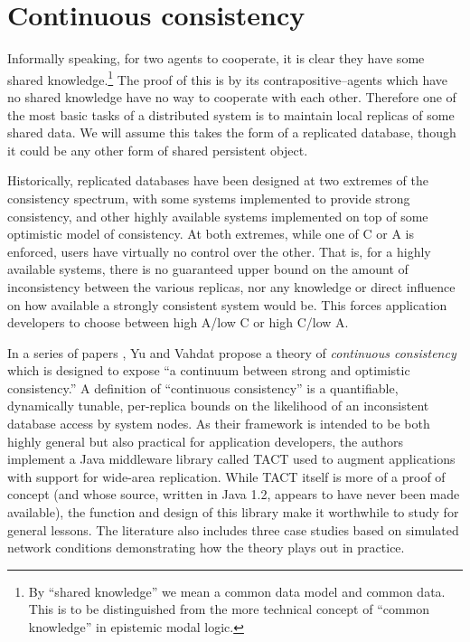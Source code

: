 \section{Continuous consistency}


Informally speaking, for two agents to cooperate, it is clear they have some shared knowledge.\footnote{By ``shared knowledge'' we mean a common data model and common data. This is to be distinguished from the more technical concept of ``common knowledge'' in epistemic modal logic.} The proof of this is by its contrapositive--agents which have no shared knowledge have no way to cooperate with each other. Therefore one of the most basic tasks of a distributed system is to maintain local replicas of some shared data. We will assume this takes the form of a replicated database, though it could be any other form of shared persistent object.

Historically, replicated databases have been designed at two extremes of the consistency spectrum, with some systems implemented to provide strong consistency, and other highly available systems implemented on top of some optimistic model of consistency. At both extremes, while one of C or A is enforced, users have virtually no control over the other. That is, for a highly available systems, there is no guaranteed upper bound on the amount of inconsistency between the various replicas, nor any knowledge or direct influence on how available a strongly consistent system would be. This forces application developers to choose between high A/low C or high C/low A.

In a series of papers \cite{2000tact} \cite{2000tactalgorithms} \cite{2002tact}, Yu and Vahdat propose a theory of \emph{continuous consistency} which is designed to expose ``a continuum between strong and optimistic consistency.''  A definition of  ``continuous consistency'' is a quantifiable, dynamically tunable, per-replica bounds on the likelihood of an inconsistent database access by system nodes. As their framework is intended to be both highly general but also practical for application developers, the authors implement a Java middleware library called TACT used to augment applications with support for wide-area replication. While TACT itself is more of a proof of concept (and whose source, written in Java 1.2, appears to have never been made available), the function and design of this library make it worthwhile to study for general lessons. The literature also includes three case studies based on simulated network conditions demonstrating how the theory plays out in practice. \cite{2002tact}

